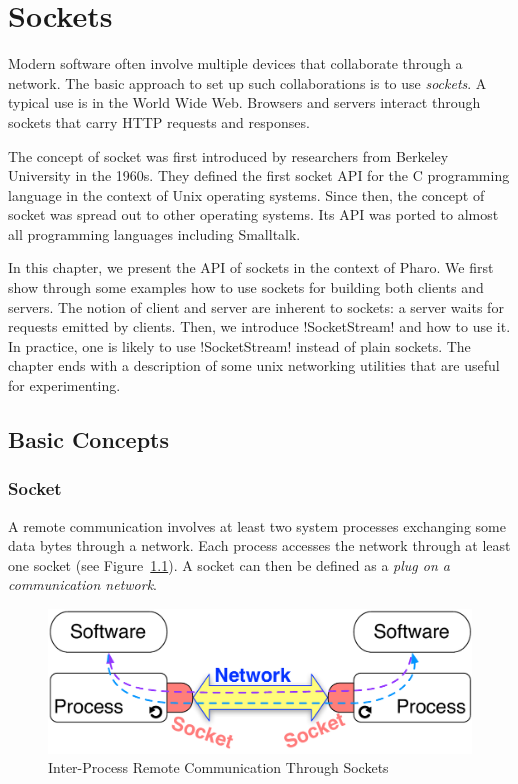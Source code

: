 \documentclass[a4paper,10pt,twoside]{book}
\begin{document}
	\sloppy
\fi
\newcommand{\noury}[1]{\nnbb{Noury}{#1}}


\chapter{Sockets}\label{cha:sockets}
\chapterauthor{\authornoury{}}

Modern software often involve multiple devices that collaborate through a network.
The basic approach to set up such collaborations is to use \textit{sockets}. A typical use is in the World Wide Web. Browsers and servers interact through sockets that carry HTTP requests and responses.

The concept of socket was first introduced by researchers from Berkeley University in the 1960s. They defined the first socket API for the C programming language in the context of Unix operating systems. Since then, the concept of socket was spread out to other operating systems. 
Its API was ported to almost all programming languages including Smalltalk.

In this chapter, we present the API of sockets in the context of Pharo.
We first show through some examples how to use sockets for building both clients and servers. The notion of client and server are inherent to sockets: a server waits for requests emitted by clients.
Then, we introduce \ct!SocketStream! and how to use it.
In practice, one is likely to use \ct!SocketStream! instead of plain sockets.
The chapter ends with a description of some unix networking utilities that are useful for experimenting.

\section{Basic Concepts}
\subsection{Socket}
A remote communication involves at least two system processes exchanging some data bytes through a network. Each process accesses the network through at least one socket (see Figure~\ref{fig:socketConcept}).
A socket can then be defined as a \textit{plug on a communication network}.

\begin{figure}[ht]\centering
	\includegraphics[width=.75\linewidth]{socketConcept}
	\caption{Inter-Process Remote Communication Through Sockets}
	\label{fig:socketConcept}
\end{figure}
\end{document}
